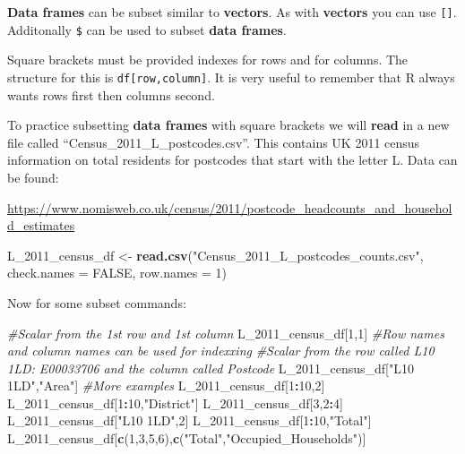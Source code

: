 \documentclass[]{book}
\newenvironment{Shaded}{\begin{snugshade}}{\end{snugshade}}
\newcommand{\KeywordTok}[1]{\textcolor[rgb]{0.13,0.29,0.53}{\textbf{#1}}}
\newcommand{\DataTypeTok}[1]{\textcolor[rgb]{0.13,0.29,0.53}{#1}}
\newcommand{\DecValTok}[1]{\textcolor[rgb]{0.00,0.00,0.81}{#1}}
\newcommand{\StringTok}[1]{\textcolor[rgb]{0.31,0.60,0.02}{#1}}
\newcommand{\CommentTok}[1]{\textcolor[rgb]{0.56,0.35,0.01}{\textit{#1}}}
\newcommand{\OtherTok}[1]{\textcolor[rgb]{0.56,0.35,0.01}{#1}}
\newcommand{\OperatorTok}[1]{\textcolor[rgb]{0.81,0.36,0.00}{\textbf{#1}}}
\newcommand{\NormalTok}[1]{#1}
\begin{document}
\textbf{Data frames} can be subset similar to \textbf{vectors}. As with
\textbf{vectors} you can use \texttt{{[}{]}}. Additonally \texttt{\$}
can be used to subset \textbf{data frames}.

Square brackets must be provided indexes for rows and for columns. The
structure for this is \texttt{df{[}row,column{]}}. It is very useful to
remember that R always wants rows first then columns second.

To practice subsetting \textbf{data frames} with square brackets we will
\textbf{read} in a new file called ``Census\_2011\_L\_postcodes.csv''.
This contains UK 2011 census information on total residents for
postcodes that start with the letter L. Data can be found:

\url{https://www.nomisweb.co.uk/census/2011/postcode_headcounts_and_household_estimates}

\begin{Shaded}
\begin{Highlighting}[]
\NormalTok{L_2011_census_df <-}\StringTok{ }\KeywordTok{read.csv}\NormalTok{(}\StringTok{"Census_2011_L_postcodes_counts.csv"}\NormalTok{, }\DataTypeTok{check.names =} \OtherTok{FALSE}\NormalTok{,}
                             \DataTypeTok{row.names =} \DecValTok{1}\NormalTok{)}
\end{Highlighting}
\end{Shaded}

Now for some subset commands:

\begin{Shaded}
\begin{Highlighting}[]
\CommentTok{#Scalar from the 1st row and 1st column}
\NormalTok{L_2011_census_df[}\DecValTok{1}\NormalTok{,}\DecValTok{1}\NormalTok{]}
\CommentTok{#Row names and column names can be used for indexxing}
\CommentTok{#Scalar from the row called L10 1LD: E00033706 and the column called Postcode}
\NormalTok{L_2011_census_df[}\StringTok{"L10 1LD"}\NormalTok{,}\StringTok{"Area"}\NormalTok{]}
\CommentTok{#More examples}
\NormalTok{L_2011_census_df[}\DecValTok{1}\OperatorTok{:}\DecValTok{10}\NormalTok{,}\DecValTok{2}\NormalTok{]}
\NormalTok{L_2011_census_df[}\DecValTok{1}\OperatorTok{:}\DecValTok{10}\NormalTok{,}\StringTok{"District"}\NormalTok{]}
\NormalTok{L_2011_census_df[}\DecValTok{3}\NormalTok{,}\DecValTok{2}\OperatorTok{:}\DecValTok{4}\NormalTok{]}
\NormalTok{L_2011_census_df[}\StringTok{"L10 1LD"}\NormalTok{,}\DecValTok{2}\NormalTok{]}
\NormalTok{L_2011_census_df[}\DecValTok{1}\OperatorTok{:}\DecValTok{10}\NormalTok{,}\StringTok{"Total"}\NormalTok{]}
\NormalTok{L_2011_census_df[}\KeywordTok{c}\NormalTok{(}\DecValTok{1}\NormalTok{,}\DecValTok{3}\NormalTok{,}\DecValTok{5}\NormalTok{,}\DecValTok{6}\NormalTok{),}\KeywordTok{c}\NormalTok{(}\StringTok{"Total"}\NormalTok{,}\StringTok{"Occupied_Households"}\NormalTok{)]}
\end{Highlighting}
\end{Shaded}
\end{document}
